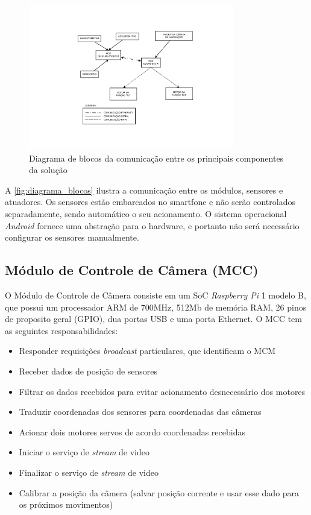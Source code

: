 \begin{figure}[H]
	\centering
	\includegraphics[trim={6cm 3cm 5cm 3cm},clip,width=0.8\textwidth]{figuras/diagrama-modulos-eps-converted-to.pdf}
	\caption{Diagrama de blocos da comunicação entre os principais componentes da solução}
	\label{fig:diagrama_blocos}
\end{figure}

A \autoref{fig:diagrama_blocos} ilustra a comunicação entre os módulos, sensores e atuadores. Os sensores estão embarcados no smartfone e não serão controlados separadamente, sendo automático o seu acionamento. O sistema operacional \textit{Android} fornece uma abstração para o hardware, e portanto não será necessário configurar os sensores manualmente.

\subsection{Módulo de Controle de Câmera (MCC)}
\label{subsec:modconcam}

O Módulo de Controle de Câmera consiste em um SoC \textit{Raspberry Pi} 1 modelo B, que possui um processador ARM de 700MHz, 512Mb de memória RAM, 26 pinos de proposito geral (GPIO), dua portas USB e uma porta Ethernet. O MCC tem as seguintes responsabilidades:

\begin{itemize}
	\item Responder requisições \textit{broadcast} particulares, que identificam o MCM
	\item Receber dados de posição de sensores
	\item Filtrar os dados recebidos para evitar acionamento desnecessário dos motores
	\item Traduzir coordenadas dos sensores para coordenadas das câmeras
	\item Acionar dois motores servos de acordo coordenadas recebidas
	\item Iniciar o serviço de \textit{stream} de video
	\item Finalizar o serviço de \textit{stream} de video
	\item Calibrar a posição da câmera (salvar posição corrente e usar esse dado para os próximos movimentos)
\end{itemize}

